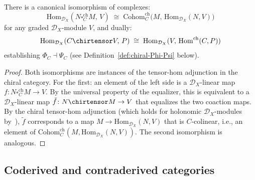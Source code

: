 \begin{lemma}\label{lem:chiral-co-contra-adjunction}
There is a canonical isomorphism of complexes:
\[
\mathrm{Hom}_{\mathcal{D}_X}(N \square_C^{\mathrm{ch}} M,\, V)
\;\cong\;
\mathrm{Cohom}_C^{\mathrm{ch}}\bigl(M,\,
\mathrm{Hom}_{\mathcal{D}_X}(N, V)\bigr)
\]
for any graded $\mathcal{D}_X$-module $V$, and dually:
\[
\mathrm{Hom}_{\mathcal{D}_X}(C \chirtensor V,\, P)
\;\cong\;
\mathrm{Hom}_{\mathcal{D}_X}(V,\,
\mathrm{Hom}^{\mathrm{ch}}(C, P))
\]
establishing $\Phi_C \dashv \Psi_C$
(see Definition~\textup{\ref{def:chiral-Phi-Psi}} below).
\end{lemma}

\begin{proof}
Both isomorphisms are instances of the tensor-hom adjunction in the
chiral category.  For the first: an element of the left side is a
$\mathcal{D}_X$-linear map $f\colon N \square_C^{\mathrm{ch}} M \to V$.
By the universal property of the equalizer, this is equivalent to a
$\mathcal{D}_X$-linear map $\tilde{f}\colon N \chirtensor M \to V$
that equalizes the two coaction maps.  By the chiral tensor-hom
adjunction (which holds for holonomic $\mathcal{D}_X$-modules
by~\cite[Proposition~3.4.6]{BD04}), $\tilde{f}$ corresponds to a map
$M \to \mathrm{Hom}_{\mathcal{D}_X}(N, V)$ that is
$C$-colinear, i.e., an element of
$\mathrm{Cohom}_C^{\mathrm{ch}}(M, \mathrm{Hom}_{\mathcal{D}_X}(N, V))$.
The second isomorphism is analogous.
\end{proof}

\subsection{Coderived and contraderived categories}
\label{subsec:chiral-coderived-contraderived}


